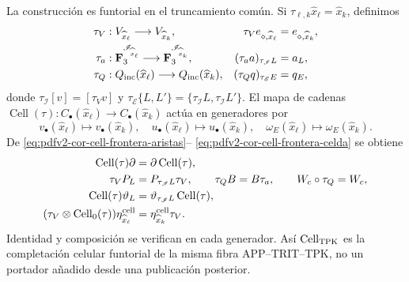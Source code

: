 La construcción es funtorial en el truncamiento común. Si
\(\tau_{\ell,k}\widehat x_\ell=\widehat x_k\), definimos
\begin{align*}
 \tau_V&:V_{\widehat x_\ell}\longrightarrow V_{\widehat x_k},&
 \tau_Ve_{\diamond,\widehat x_\ell}&=e_{\diamond,\widehat x_k},\\
 \tau_a&:\mathbf F_3^{\mathscr I_{\widehat x_\ell}}
          \longrightarrow\mathbf F_3^{\mathscr I_{\widehat x_k}},&
 (\tau_aa)_{\tau_{\mathscr I}L}&=a_L,\\
 \tau_Q&:Q_{\rm inc}(\widehat x_\ell)
          \longrightarrow Q_{\rm inc}(\widehat x_k),&
 (\tau_Qq)_{\tau_{\mathscr E}E}&=q_E,
\end{align*}
donde \(\tau_{\mathscr I}[v]=[\tau_Vv]\) y
\(\tau_{\mathscr E}\{L,L'\}=\{\tau_{\mathscr I}L,
\tau_{\mathscr I}L'\}\). El mapa de cadenas
\(\operatorname{Cell}(\tau):C_\bullet(\widehat x_\ell)
\to C_\bullet(\widehat x_k)\) actúa en generadores por
\begin{equation}
\label{eq:pdfv2-cor-cell-truncamiento-generadores}
 v_\bullet(\widehat x_\ell)\mapsto v_\bullet(\widehat x_k),\quad
 u_\bullet(\widehat x_\ell)\mapsto u_\bullet(\widehat x_k),\quad
 \omega_E(\widehat x_\ell)\mapsto\omega_E(\widehat x_k).
\end{equation}
De \eqref{eq:pdfv2-cor-cell-frontera-aristas}--
\eqref{eq:pdfv2-cor-cell-frontera-celda} se obtiene
\begin{equation}
\label{eq:pdfv2-cor-collar-naturalidad}
\begin{aligned}
 \operatorname{Cell}(\tau)\partial
 &=\partial\operatorname{Cell}(\tau),\\
 \tau_VP_L&=P_{\tau_{\mathscr I}L}\tau_V,\qquad
 \tau_QB=B\tau_a,\qquad W_c\circ\tau_Q=W_c,\\
 \operatorname{Cell}(\tau)\vartheta_L
 &=\vartheta_{\tau_{\mathscr I}L}\operatorname{Cell}(\tau),\\
 (\tau_V\otimes\operatorname{Cell}_0(\tau))
 \eta^{\rm cell}_{\widehat x_\ell}
 &=\eta^{\rm cell}_{\widehat x_k}\tau_V.
\end{aligned}
\end{equation}
Identidad y composición se verifican en cada generador. Así
\(\operatorname{Cell}_{\rm TPK}\) es la completación celular funtorial de
la misma fibra APP--TRIT--TPK, no un portador añadido desde una publicación
posterior.

